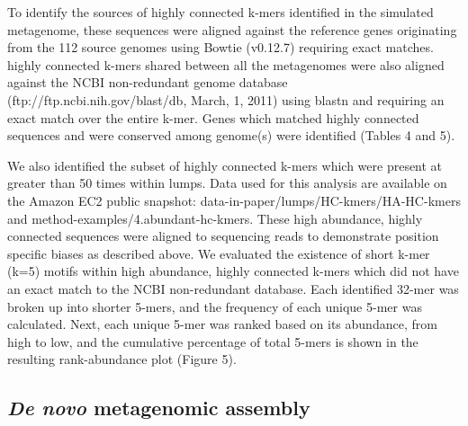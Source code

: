 \documentclass[10pt]{article}
\begin{document}
To identify the sources of highly connected k-mers identified in the
simulated metagenome, these sequences were aligned against the
reference genes originating from the 112 source genomes using Bowtie
(v0.12.7) requiring exact matches.  highly connected k-mers shared
between all the metagenomes were also aligned against the NCBI
non-redundant genome database (ftp://ftp.ncbi.nih.gov/blast/db, March,
1, 2011) using blastn \cite{Altschul:1990p1335} and requiring an exact
match over the entire k-mer.  Genes which matched highly connected
sequences and were conserved among genome(s) were identified (Tables 4
and 5).

We also identified the subset of highly connected k-mers which were
present at greater than 50 times within lumps. Data used for this
analysis are available on the Amazon EC2 public snapshot:
data-in-paper/lumps/HC-kmers/HA-HC-kmers and
method-examples/4.abundant-hc-kmers. These high abundance, highly
connected sequences were aligned to sequencing reads to demonstrate
position specific biases as described above.  We evaluated the
existence of short k-mer (k=5) motifs within high abundance, highly
connected k-mers which did not have an exact match to the NCBI
non-redundant database.  Each identified 32-mer was broken up into
shorter 5-mers, and the frequency of each unique 5-mer was calculated.
Next, each unique 5-mer was ranked based on its abundance, from high
to low, and the cumulative percentage of total 5-mers is shown in the
resulting rank-abundance plot (Figure 5).
  
\subsection*{\emph{De novo} metagenomic assembly}
\end{document}
